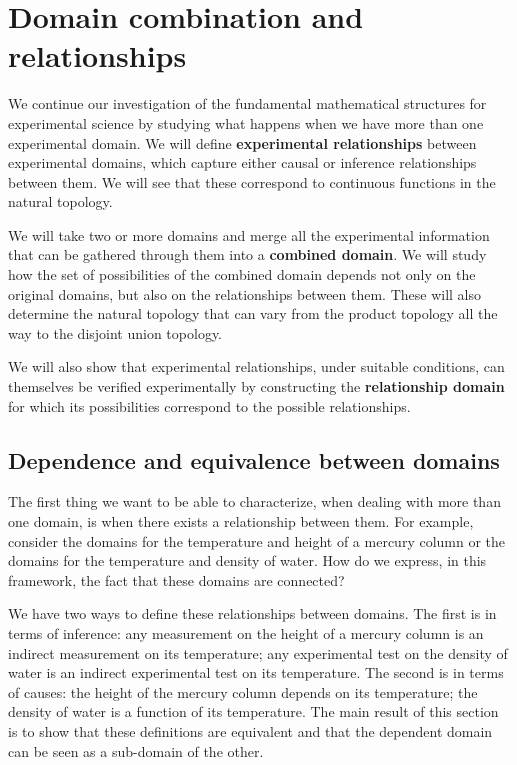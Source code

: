 \chapter{Domain combination and relationships}

We continue our investigation of the fundamental mathematical structures for experimental science by studying what happens when we have more than one experimental domain. We will define \textbf{experimental relationships} between experimental domains, which capture either causal or inference relationships between them. We will see that these correspond to continuous functions in the natural topology.

We will take two or more domains and merge all the experimental information that can be gathered through them into a \textbf{combined domain}. We will study how the set of possibilities of the combined domain depends not only on the original domains, but also on the relationships between them. These will also determine the natural topology that can vary from the product topology all the way to the disjoint union topology.

We will also show that experimental relationships, under suitable conditions, can themselves be verified experimentally by constructing the \textbf{relationship domain} for which its possibilities correspond to the possible relationships.

\section{Dependence and equivalence between domains}

The first thing we want to be able to characterize, when dealing with more than one domain, is when there exists a relationship between them. For example, consider the domains for the temperature and height of a mercury column or the domains for the temperature and density of water. How do we express, in this framework, the fact that these domains are connected?

We have two ways to define these relationships between domains. The first is in terms of inference: any measurement on the height of a mercury column is an indirect measurement on its temperature; any experimental test on the density of water is an indirect experimental test on its temperature. The second is in terms of causes: the height of the mercury column depends on its temperature; the density of water is a function of its temperature. The main result of this section is to show that these definitions are equivalent and that the dependent domain can be seen as a sub-domain of the other.

